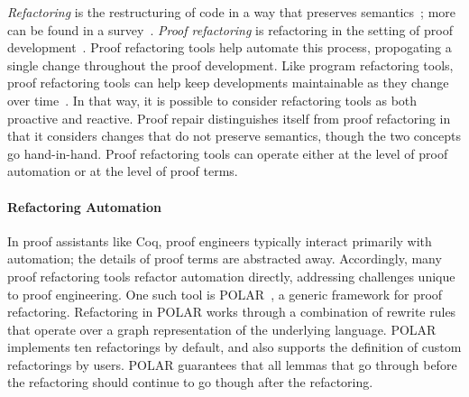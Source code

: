 \iffalse
\textit{Refactoring} is the restructuring of code in a way that preserves semantics~\cite{opdyke1992refactoring};
more can be found in a survey~\cite{mens2004survey}.
\textit{Proof refactoring} is refactoring in the setting of proof development~\cite{WhitesidePhD}.
Proof refactoring tools help automate this process, propogating a single change throughout the proof development.
Like program refactoring tools, proof refactoring tools can help keep developments
maintainable as they change over time~\cite{Bourke12}. In that way, it is possible to consider refactoring tools 
as both proactive and reactive.
Proof repair distinguishes itself from proof refactoring in that it considers changes that do not
preserve semantics, though the two concepts go hand-in-hand.
Proof refactoring tools can operate either at the level of proof automation or at the level of proof terms.


\paragraph{Refactoring Automation}

In proof assistants like Coq, proof engineers typically interact primarily with automation;
the details of proof terms are abstracted away. Accordingly, many proof refactoring tools
refactor automation directly, addressing challenges unique to proof engineering. %
One such tool is \textsc{POLAR}~\cite{Dietrich2013}, a generic framework for proof refactoring. 
Refactoring in \textsc{POLAR} works through a combination of rewrite rules that operate over
a graph representation of the underlying language. %
\textsc{POLAR} implements ten refactorings by default,
and also supports the definition of custom refactorings by users. 
\textsc{POLAR} guarantees that all lemmas that go through before
the refactoring should continue to go though after the refactoring.

